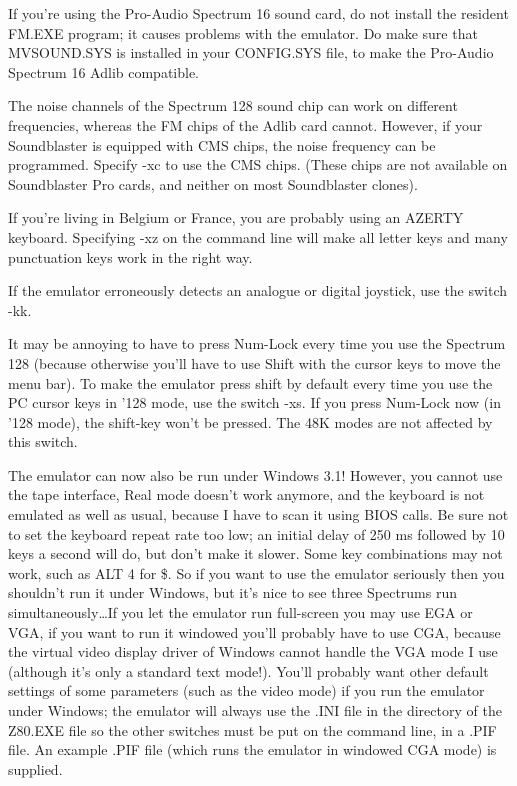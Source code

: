     If you're using the Pro-Audio Spectrum 16 sound card, do not install the
    resident FM.EXE program; it causes problems with the emulator. Do make
    sure that MVSOUND.SYS is installed in your CONFIG.SYS file, to make the
    Pro-Audio Spectrum 16 Adlib compatible.

    The noise channels of the Spectrum 128 sound chip can work on different
    frequencies, whereas the FM chips of the Adlib card cannot.  However, if
    your Soundblaster is equipped with CMS chips, the noise frequency can be
    programmed.  Specify -xc to use the CMS chips.  (These chips are not
    available on Soundblaster Pro cards, and neither on most Soundblaster
    clones).

    If you're living in Belgium or France, you are probably using an AZERTY
    keyboard.  Specifying -xz on the command line will make all letter keys
    and many punctuation keys work in the right way.

    If the emulator erroneously detects an analogue or digital joystick, use
    the switch -kk.

    It may be annoying to have to press Num-Lock every time you use the
    Spectrum 128 (because otherwise you'll have to use Shift with the cursor
    keys to move the menu bar).  To make the emulator press shift by default
    every time you use the PC cursor keys in '128 mode, use the switch -xs.
    If you press Num-Lock now (in '128 mode), the shift-key won't be
    pressed.  The 48K modes are not affected by this switch.

    The emulator can now also be run under Windows 3.1!  However, you cannot
    use the tape interface, Real mode doesn't work anymore, and the keyboard
    is not emulated as well as usual, because I have to scan it using BIOS
    calls.  Be sure not to set the keyboard repeat rate too low; an initial
    delay of 250 ms followed by 10 keys a second will do, but don't make it
    slower.  Some key combinations may not work, such as ALT 4 for \$.  So if
    you want to use the emulator seriously then you shouldn't run it under
    Windows, but it's nice to see three Spectrums run simultaneously\ldots If
    you let the emulator run full-screen you may use EGA or VGA, if you want
    to run it windowed you'll probably have to use CGA, because the virtual
    video display driver of Windows cannot handle the VGA mode I use
    (although it's only a standard text mode!).  You'll probably want other
    default settings of some parameters (such as the video mode) if you run
    the emulator under Windows; the emulator will always use the .INI file
    in the directory of the Z80.EXE file so the other switches must be put
    on the command line, in a .PIF file.  An example .PIF file (which runs
    the emulator in windowed CGA mode) is supplied.

